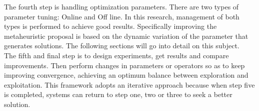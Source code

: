 The fourth step is handling optimization parameters. There are two types of parameter tuning: Online and Off line. In this research, management of both types is performed to achieve good results. Specifically improving the metaheuristic proposal is based on the dynamic variation of the parameter that generates solutions. The following sections will go into detail on this subject.\\

The fifth and final step is to design experiments, get results and compare improvements. Then perform changes in parameters or operators so as to keep improving convergence, achieving an optimum balance between exploration and exploitation. This framework adopts an iterative approach because when step five is completed, systems can return to step one, two or three to seek a better solution.